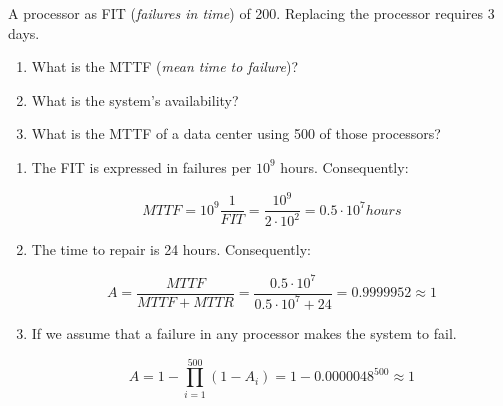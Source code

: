 \begin{acexercise}\end{acexercise}

A processor as FIT (\emph{failures in time}) of 200. Replacing the processor requires 3 days.

\begin{enumerate}

\item What is the MTTF (\emph{mean time to failure})?

\item What is the system's availability?

\item What is the MTTF of a data center using 500 of those processors?

\end{enumerate}

\begin{acsolution}\end{acsolution}

\begin{enumerate}

\item The FIT is expressed in failures per $10^9$ hours. Consequently:

\[MTTF = 10^9 \frac{1}{FIT} = \frac{10^9}{2 \cdot 10^2} = 0.5 \cdot 10^7 hours\]

\item The time to repair is 24 hours. Consequently:

\[
A = \frac{MTTF}{MTTF + MTTR} =
\frac{0.5 \cdot 10^7}{0.5 \cdot 10^7 + 24} =
0.9999952 \approx 1
\]

\item If we assume that a failure in any processor makes the system to fail.

\[
A = 1 - \prod_{i=1}^{500}(1 - A_i) = 1 - 0.0000048^{500} \approx 1
\]

\end{enumerate}

